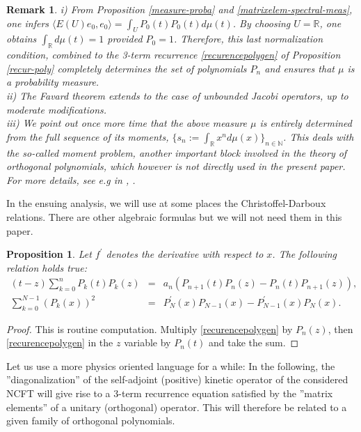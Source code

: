 \documentclass[a4paper,11pt,twoside]{article}
\numberwithin{equation}{section}
\newtheorem{proposition}[Theorem]{Proposition}
\newtheorem{remark}[Theorem]{Remark}
\theoremstyle{nonumberplain}
\newtheorem{proof}{Proof}
\begin{document}
\begin{remark}
i) From Proposition \ref{measure-proba} and \ref{matrixelem-spectral-meas}, one infers $\langle E(U)e_0,e_0 \rangle=\int_UP_0(t)P_0(t)d\mu(t)$. By choosing $U=\mathbb{R}$, one obtains $\int_\mathbb{R}d\mu(t)=1$ provided $P_0=1$. Therefore, this last normalization condition, combined to the 3-term recurrence \eqref{recurencepolygen} of Proposition \ref{recur-poly} completely determines the set of polynomials $P_n$ and ensures that $\mu$ is a probability measure.\\
ii) The Favard theorem extends to the case of unbounded Jacobi operators, up to moderate modifications.\\
iii) We point out once more time that the above measure $\mu$ is entirely determined from the full sequence of its moments, $\{s_n:=\int_\mathbb{R}x^nd\mu(x) \}_{n\in\mathbb{N}}$. This deals with the so-called moment problem, another important block involved in the theory of orthogonal polynomials, which however is not directly used in the present paper. For more details, see e.g in \cite{akhiez:1965}, \cite{bsimon}.
\end{remark}
In the ensuing analysis, we will use at some places the Christoffel-Darboux relations. There are other algebraic formulas but we will not need them in this paper.
\begin{proposition}\label{chris-darb-rel}
Let $f^\prime$ denotes the derivative with respect to $x$. The following relation holds true: 
\begin{eqnarray}
(t-z)\sum_{k=0}^nP_k(t)P_k(z)&=&a_n(P_{n+1}(t)P_{n}(z)-P_{n}(t)P_{n+1}(z)),\label{christof-darb}\\
\sum_{k=0}^{N-1}(P_k(x))^2&=&P^\prime_N(x)P_{N-1}(x)-P^\prime_{N-1}(x)P_N(x)\label{christoff-darb2}.
\end{eqnarray}
\end{proposition}
\begin{proof}
This is routine computation. Multiply \eqref{recurencepolygen} by $P_{n}(z)$, then \eqref{recurencepolygen} in the $z$ variable by $P_n(t)$ and take the sum.
\end{proof}
Let us use a more physics oriented language for a while: In the following, the ''diagonalization'' of the self-adjoint (positive) kinetic operator of the considered NCFT will give rise to a 3-term recurrence equation satisfied by the ''matrix elements'' of a unitary (orthogonal) operator. This will therefore be related to a given family of orthogonal polynomials. \par  
\end{document}

